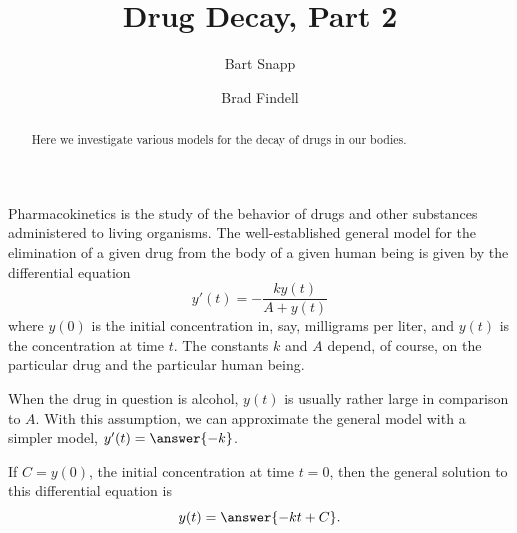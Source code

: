 \documentclass{ximera}
\title{Drug Decay, Part 2}
\author{Bart Snapp \and Brad Findell}
\begin{document}
\begin{abstract}
Here we investigate various models for the decay of drugs in our bodies.  
\end{abstract}
\maketitle


Pharmacokinetics is the study of the behavior of drugs and other substances administered to living organisms.  
The well-established general model for 
the elimination of a given drug from the body of a given human being is given by the differential equation 
$$y'(t)=-\frac{ky(t)}{A+y(t)}$$
where $y(0)$ is the initial concentration in, say, milligrams per liter, and $y(t)$ is the concentration at time $t$.  The constants $k$ and $A$ depend, of course, on the particular drug and the particular human being. 


\begin{question}
When the drug in question is alcohol, $y(t)$ is usually rather large in comparison to $A$.   With this assumption, we can approximate the general model with a simpler model, $y'(t)=\answer{-k}$.    

If $C=y(0)$, the initial concentration at time $t=0$, then the general solution to this differential equation is 
\[  
y(t) =\answer{ -kt + C}.  
\]
\end{question}
\end{document}
